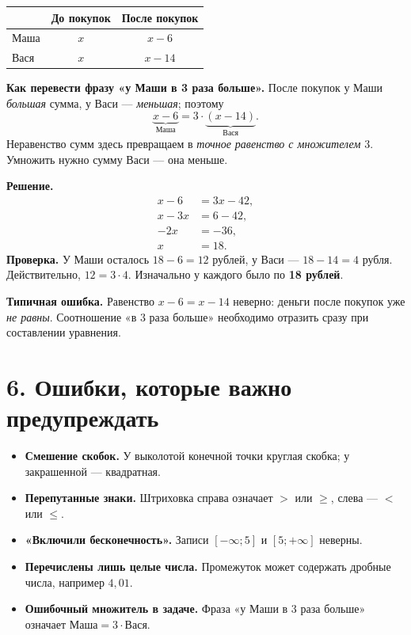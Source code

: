\documentclass[a4paper,12pt]{article}
\newcommand{\headingrule}{\vspace{-0.5em}{\color{accent}\hrule height 0.55pt}\vspace{0.5em}}
\newcommand{\key}[1]{\textbf{\color{darkaccent}#1}}
\begin{document}
\begin{center}
\renewcommand{\arraystretch}{1.33}
\begin{tabularx}{.87\linewidth}{@{}Xcc@{}}
\toprule
& \textbf{До покупок} & \textbf{После покупок}\\
\midrule
Маша & $x$ & $x-6$\\
Вася & $x$ & $x-14$\\
\bottomrule
\end{tabularx}
\end{center}

\key{Как перевести фразу «у Маши в 3 раза больше».} После покупок у Маши \emph{большая} сумма, у Васи --- \emph{меньшая}; поэтому
\[
\underbrace{x-6}_{\text{Маша}}
=3\cdot\underbrace{(x-14)}_{\text{Вася}}.
\]
Неравенство сумм здесь превращаем в \emph{точное равенство с множителем $3$}. Умножить нужно сумму Васи --- она меньше.

\key{Решение.}
\[
\begin{aligned}
x-6&=3x-42,\\
x-3x&=6-42,\\
-2x&=-36,\\
x&=18.
\end{aligned}
\]
\key{Проверка.} У Маши осталось $18-6=12$ рублей, у Васи --- $18-14=4$ рубля. Действительно, $12=3\cdot4$. Изначально у каждого было по \key{18 рублей}.

\key{Типичная ошибка.} Равенство $x-6=x-14$ неверно: деньги после покупок уже \emph{не равны}. Соотношение «в 3 раза больше» необходимо отразить сразу при составлении уравнения.

\section*{6. Ошибки, которые важно предупреждать}
\headingrule
\begin{itemize}
\item \key{Смешение скобок.} У выколотой конечной точки круглая скобка; у закрашенной --- квадратная.
\item \key{Перепутанные знаки.} Штриховка справа означает $>$ или $\ge$, слева --- $<$ или $\le$.
\item \key{«Включили бесконечность».} Записи $[-\infty;5]$ и $[5;+\infty]$ неверны.
\item \key{Перечислены лишь целые числа.} Промежуток может содержать дробные числа, например $4{,}01$.
\item \key{Ошибочный множитель в задаче.} Фраза «у Маши в 3 раза больше» означает $\text{Маша}=3\cdot\text{Вася}$.
\end{itemize}
\clearpage
\end{document}
